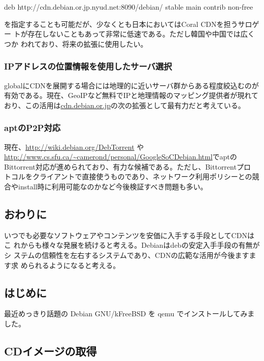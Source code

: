 \documentclass[mingoth,a4paper]{jsarticle}
\begin{document}
\begin{commandline}
 deb http://cdn.debian.or.jp.nyud.net:8090/debian/ stable main contrib non-free
\end{commandline}
を指定することも可能だが、少なくとも日本においてはCoral CDNを担うサロゲー
トが存在しないこともあって非常に低速である。ただし韓国や中国では広くつか
われており、将来の拡張に使用したい。

\subsubsection{IPアドレスの位置情報を使用したサーバ選択}

globalにCDNを展開する場合には地理的に近いサーバ群からある程度絞込むのが
有効である。現在、GeoIPなど無料でIPと地理情報のマッピング提供者が現れて
おり、この活用は\url{cdn.debian.or.jp}の次の拡張として最有力だと考えている。

\subsubsection{aptのP2P対応}

現在、\url{http://wiki.debian.org/DebTorrent} や
\url{http://www.cs.sfu.ca/~camerond/personal/GoogleSoCDebian.html}でaptの
Bittorrent対応が進められており、有力な候補である。ただし、Bittorrentプロ
トコルをクライアントで直接使うものであり、ネットワーク利用ポリシーとの競
合やinstall時に利用可能なのかなど今後検証すべき問題も多い。


\subsection{おわりに}

いつでも必要なソフトウェアやコンテンツを安価に入手する手段としてCDNはこ
れからも様々な発展を続けると考える。Debianはdebの安定入手手段の有無がシ
ステムの信頼性を左右するシステムであり、CDNの広範な活用が今後ますます求
められるようになると考える。


\label{sec:debiankfreebsd}

\subsection{はじめに}

最近めっきり話題の Debian GNU/kFreeBSD を qemu でインストールしてみました。

\subsection{CDイメージの取得}
\end{document}
